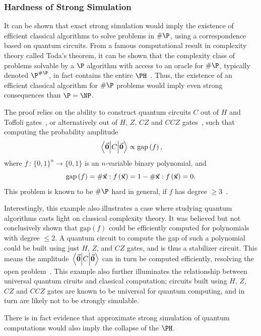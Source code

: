\subsubsection*{Hardness of Strong Simulation}
It can be shown that exact strong simulation would imply the existence of efficient classical algorithms to solve problems in $\#\P$, using a correspondence based on quantum circuits. From a famous computational result in complexity theory called Toda's theorem, it can be shown that the complexity class of problems solvable by a $\P$ algorithm with access to an oracle for $\#\P$, typically denoted $\P^{\#\P}$, in fact contains the entire $\PH$~\cite{Toda1991}. Thus, the existence of an efficient classical algorithm for $\#\P$ problems would imply even strong consequences than $\P=\NP$.\par
The proof relies on the ability to construct quantum circuits $C$ out of $H$ and Toffoli gates~\cite{Dawson2004}, or alternatively out of $H$, $Z$, $CZ$ and $CCZ$ gates~\cite{Montanaro2017}, such that computing the probability amplitude 
\[\matrixel{\va{0}}{C}{\va{0}} \propto \text{gap}\left(f\right),\]
where $f\,:\,\{0,1\}^{n}\rightarrow \{0,1\}$ is an $n$-variable binary polynomial, and
\[\text{gap}\left(f\right) = \# \va{x}:f\left(\va{x}\right)=1 - \# \va{x}:f\left(\va{x}\right)=0.\]
This problem is known to be $\#\P$ hard in general, if $f$ has degree $\geq 3$~\cite{Montanaro2017}.\par
Interestingly, this example also illustrates a case where studying quantum algorithms casts light on classical complexity theory. It was believed but not conclusively shown that $\text{gap}\left(f\right)$ could be efficiently computed for polynomials with degree $\leq 2$. A quantum circuit to compute the gap of such a polynomial could be built using just $H$, $Z$, and $CZ$ gates, and is thus a stabilizer circuit. This means the amplitude $\matrixel{\va{0}}{C}{\va{0}}$ can in turn be computed efficiently, resolving the open problem~\cite{Montanaro2017}. This example also further illuminates the relationship between universal quantum ciruits and classical computation; circuits built using $H$, $Z$, $CZ$ and $CCZ$ gates are known to be universal for quantum computing, and in turn are likely not to be strongly simulable.\par
There is in fact evidence that approximate strong simulation of quantum computations would also imply the collapse of the $\PH$.
